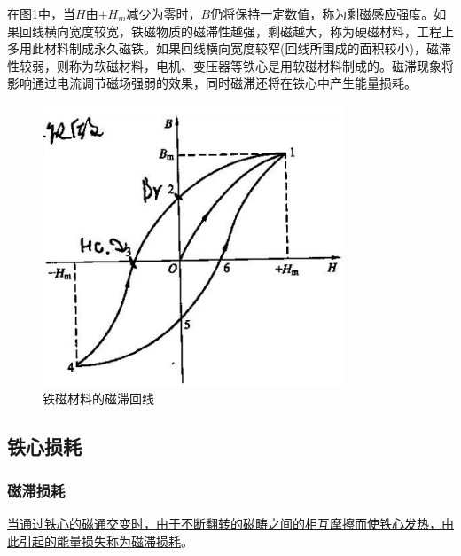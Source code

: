 \documentclass{book}
\begin{document}
在图\ref{fig_1.4}中，当$H$由$+{{H}_{m}}$减少为零时，$B$仍将保持一定数值，称为剩磁感应强度。如果回线横向宽度较宽，铁磁物质的磁滞性越强，剩磁越大，称为硬磁材料，工程上多用此材料制成永久磁铁。如果回线横向宽度较窄(回线所围成的面积较小)，磁滞性较弱，则称为软磁材料，电机、变压器等铁心是用软磁材料制成的。磁滞现象将影响通过电流调节磁场强弱的效果，同时磁滞还将在铁心中产生能量损耗。
\begin{figure}[H]
	\centering
	\includegraphics[width=0.80\textwidth]{1-4.png}
	\caption{铁磁材料的磁滞回线}
	\label{fig_1.4}
\end{figure}

\subsection{铁心损耗}
\subsubsection{磁滞损耗}
\uline{当通过铁心的磁通交变时，由于不断翻转的磁畴之间的相互摩擦而使铁心发热，由此引起的能量损失称为磁滞损耗}。
\end{document}

